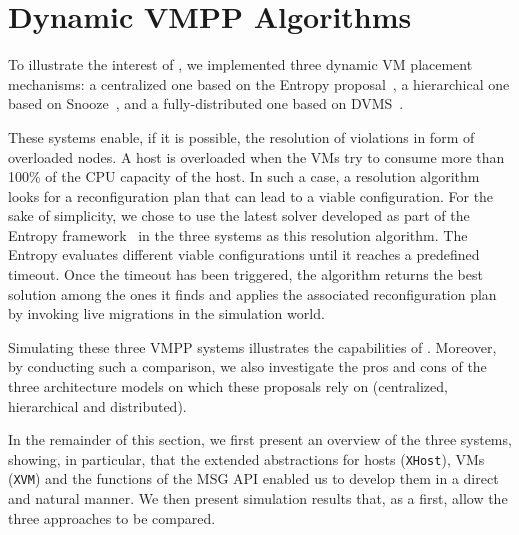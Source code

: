 \section{Dynamic VMPP Algorithms}
\label{sec:vm-schedulers}

To illustrate the interest of \vmps, we implemented three dynamic VM
placement mechanisms: a centralized one based on the Entropy
proposal~\cite{Hermenier:2009:ECM:1508293.1508300}, a hierarchical one
based on Snooze~\cite{feller:ccgrid12}, and a fully-distributed one
based on DVMS~\cite{quesnel:cpe2012}.


These systems enable, if it is possible,  the resolution  of violations in form of
overloaded nodes. A host is overloaded when the VMs try to consume
more than 100\% of the CPU capacity of the host. In such a case, a
resolution algorithm looks for a reconfiguration plan that can lead to
a viable configuration. For the sake of
simplicity, we chose to use the latest solver developed as part of the Entropy
framework~\cite{hermenier:cp11} in the three systems as this resolution algorithm.
The Entropy evaluates different viable configurations until  it
reaches a predefined timeout.
Once the timeout has been triggered, the algorithm returns the best
solution among the ones it finds and applies the associated
reconfiguration plan by invoking live migrations in the simulation
world.
%
%

Simulating these three VMPP systems illustrates the capabilities of
\vmps. Moreover, by conducting such a comparison, we also investigate
the pros and cons of the three architecture models on which these
proposals rely on (\ie centralized, hierarchical and distributed).

In the remainder of this section, we first present an overview of the
three systems, showing, in particular, that the extended abstractions
for hosts (\texttt{XHost}), VMs (\texttt{XVM}) and the functions of
the \sg MSG API enabled us to develop them in a direct and natural
manner. We then present simulation results that, as a first, allow the
three approaches to be compared.

